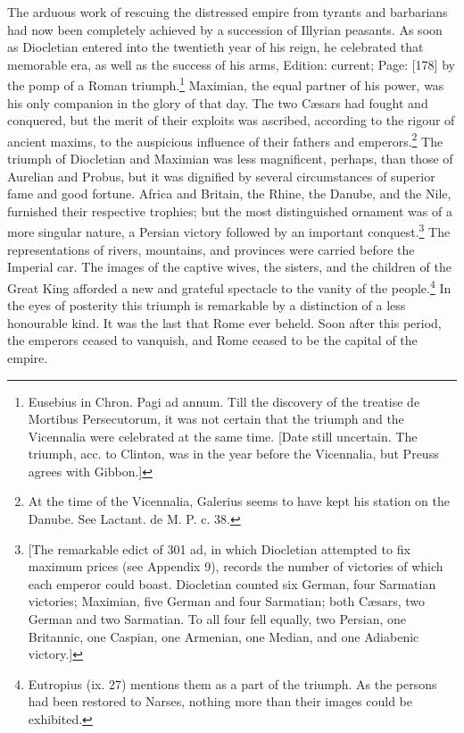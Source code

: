 The arduous work of rescuing the distressed empire from tyrants and barbarians had now been completely achieved by a succession of Illyrian peasants. As soon as Diocletian entered into the twentieth year of his reign, he celebrated that memorable era, as well as the success of his arms, Edition: current; Page: [178] by the pomp of a Roman triumph.\footnote{Eusebius in Chron. Pagi ad annum. Till the discovery of the treatise de Mortibus Persecutorum, it was not certain that the triumph and the Vicennalia were celebrated at the same time. [Date still uncertain. The triumph, acc. to Clinton, was in the year before the Vicennalia, but Preuss agrees with Gibbon.]} Maximian, the equal partner of his power, was his only companion in the glory of that day. The two Cæsars had fought and conquered, but the merit of their exploits was ascribed, according to the rigour of ancient maxims, to the auspicious influence of their fathers and emperors.\footnote{At the time of the Vicennalia, Galerius seems to have kept his station on the Danube. See Lactant. de M. P. c. 38.} The triumph of Diocletian and Maximian was less magnificent, perhaps, than those of Aurelian and Probus, but it was dignified by several circumstances of superior fame and good fortune. Africa and Britain, the Rhine, the Danube, and the Nile, furnished their respective trophies; but the most distinguished ornament was of a more singular nature, a Persian victory followed by an important conquest.\footnote{[The remarkable edict of 301 ad, in which Diocletian attempted to fix maximum prices (see Appendix 9), records the number of victories of which each emperor could boast. Diocletian counted six German, four Sarmatian victories; Maximian, five German and four Sarmatian; both Cæsars, two German and two Sarmatian. To all four fell equally, two Persian, one Britannic, one Caspian, one Armenian, one Median, and one Adiabenic victory.]} The representations of rivers, mountains, and provinces were carried before the Imperial car. The images of the captive wives, the sisters, and the children of the Great King afforded a new and grateful spectacle to the vanity of the people.\footnote{Eutropius (ix. 27) mentions them as a part of the triumph. As the persons had been restored to Narses, nothing more than their images could be exhibited.} In the eyes of posterity this triumph is remarkable by a distinction of a less honourable kind. It was the last that Rome ever beheld. Soon after this period, the emperors ceased to vanquish, and Rome ceased to be the capital of the empire.

